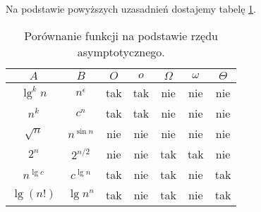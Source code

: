 \bigskip
\noindent Na podstawie powyższych uzasadnień dostajemy tabelę \ref{tab:3-2}.
\begin{table}[ht]
	\begin{center}
		\begin{tabular}{cc|c|c|c|c|c}
			$A$ & $B$ & $O$ & $o$ & $\Omega$ & $\omega$ & $\Theta$ \\
			\hline
			$\lg^kn$ & $n^\epsilon$ & tak & tak & nie & nie & nie \\
			\hline
			$n^k$ & $c^n$ & tak & tak & nie & nie & nie \\
			\hline
			$\sqrt{n}$ & $n^{\sin n}$ & nie & nie & nie & nie & nie \\
			\hline
			$2^n$ & $2^{n/2}$ & nie & nie & tak & tak & nie \\
			\hline
			$n^{\lg c}$ & $c^{\lg n}$ & tak & nie & tak & nie & tak \\
			\hline
			$\lg(n!)$ & $\lg n^n$ & tak & nie & tak & nie & tak
		\end{tabular}
		\caption{Porównanie funkcji na podstawie rzędu asymptotycznego.} \label{tab:3-2}
	\end{center}
\end{table}


